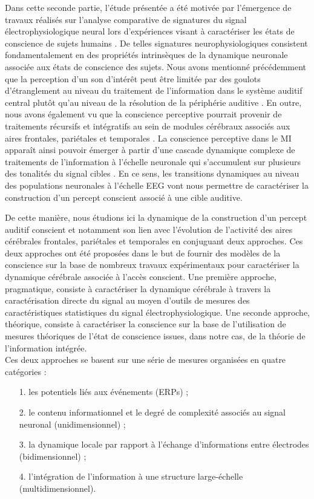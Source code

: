 Dans cette seconde partie, l'étude présentée a été motivée par l'émergence de travaux réalisés sur l'analyse comparative de signatures du signal électrophysiologique neural lors d'expériences visant à caractériser les états de conscience de sujets humains \citep{curley2018characterization, engemann2018robust, engemann2020combining, liang2015eeg, sitt2014large}. 
De telles signatures neurophysiologiques consistent fondamentalement en des propriétés intrinsèques de la dynamique neuronale associée aux états de conscience des sujets. 
Nous avons mentionné précédemment que la perception d'un son d’intérêt peut être limitée par des goulots d’étranglement au niveau du traitement de l’information dans le système auditif central plutôt qu'au niveau de la résolution de la périphérie auditive \citep{gutschalk2008neural}. 
En outre, nous avons également vu que la conscience perceptive pourrait provenir de traitements récursifs et intégratifs au sein de modules cérébraux associés aux aires frontales, pariétales et temporales \citep{eriksson2007similar, eriksson2017activity, giani2015detecting}. 
La conscience perceptive dans le MI apparaît ainsi pouvoir émerger à partir d'une cascade dynamique complexe de traitements de l'information à l'échelle neuronale qui s'accumulent sur plusieurs des tonalités du signal cibles \citep{gartner2021auditory, giani2015detecting}. 
En ce sens, les transitions dynamiques au niveau des populations neuronales à l'échelle EEG vont nous permettre de caractériser la construction d'un percept conscient associé à une cible auditive. 

De cette manière, nous étudions ici la dynamique de la construction d'un percept auditif conscient et notamment son lien avec l'évolution de l'activité des aires cérébrales frontales, pariétales et temporales en conjuguant deux approches. 
Ces deux approches ont été proposées dans le but de fournir des modèles de la conscience sur la base de nombreux travaux expérimentaux pour caractériser la dynamique cérébrale associée à l'accès conscient. 
Une première approche, pragmatique, consiste à caractériser la dynamique cérébrale à travers la caractérisation directe du signal au moyen d'outils de mesures des caractéristiques statistiques du signal électrophysiologique. 
Une seconde approche, théorique, consiste à caractériser la conscience sur la base de l'utilisation de mesures théoriques de l'état de conscience issues, dans notre cas, de la théorie de l'information intégrée. \\

Ces deux approches se basent sur une série de mesures organisées en quatre catégories :
\begin{itemize}
\item[1.] les potentiels liés aux événements (ERPs) ;
\item[2.] le contenu informationnel et le degré de complexité associés au signal neuronal (unidimensionnel) ; 
\item[3.] la dynamique locale par rapport à l'échange d'informations entre électrodes (bidimensionnel) ;
\item[4.] l'intégration de l’information à une structure large-échelle (multidimensionnel). \\
\end{itemize}

